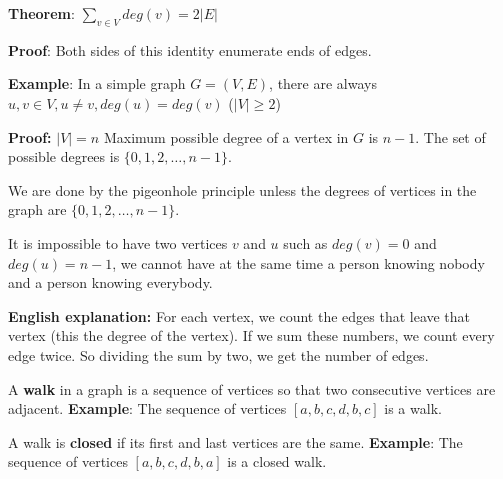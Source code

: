 \documentclass[9pt, letterpaper, oneside]{article}
\begin{document}
\textbf{Theorem}: $\displaystyle \sum_{v \in V} deg(v) = 2|E|$

\textbf{Proof}: Both sides of this identity enumerate ends of edges.

\textbf{Example}: In a simple graph $G = (V, E)$, there are always $u, v \in V, u \neq v, deg(u) = deg(v)$ ($|V| \geq 2$)

\textbf{Proof:} $|V|=n$ Maximum possible degree of a vertex in $G$ is $n-1$. The set of possible degrees is $\{0,1,2,\ldots, n-1 \}$. 

We are done by the pigeonhole principle unless the degrees of vertices in the graph are $\{0,1,2,\ldots, n-1\}$. 

It is impossible to have two vertices $v$ and $u$ such as $deg(v) = 0$ and $deg(u) = n-1$, we cannot have at the same time a person knowing nobody and a person knowing everybody.

\textbf{English explanation:} For each vertex, we count the edges that leave that vertex (this the degree of the vertex). If we sum these numbers, we count every edge twice. So dividing the sum by two, we get the number of edges.


\begin{figure}[h]
\centering
{}
\end{figure}

A \textbf{walk} in a graph is a sequence of vertices so that two consecutive vertices are adjacent.
\textbf{Example}: The sequence of vertices $[a, b, c, d, b, c]$ is a walk. 

A walk is \textbf{closed} if its first and last vertices are the same.
\textbf{Example}: The sequence of vertices $[a, b, c, d, b, a]$ is a closed walk.
\end{document}
